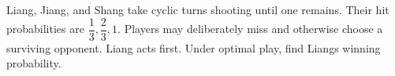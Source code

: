 Liang, Jiang, and Shang take cyclic turns shooting until one remains. Their hit probabilities are $\dfrac{1}{3},\dfrac{2}{3},1$. Players may deliberately miss and otherwise choose a surviving opponent. Liang acts first. Under optimal play, find Liang\textquotesingle s winning probability.
